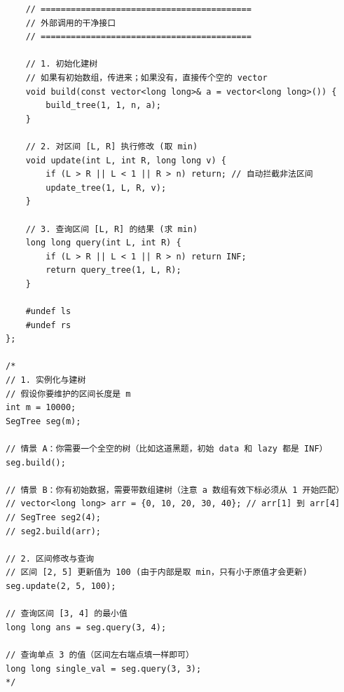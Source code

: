 \documentclass[10pt, a4paper, twocolumn]{article} %
\begin{document}
\begin{lstlisting}
    // ==========================================
    // 外部调用的干净接口
    // ==========================================

    // 1. 初始化建树 
    // 如果有初始数组，传进来；如果没有，直接传个空的 vector
    void build(const vector<long long>& a = vector<long long>()) {
        build_tree(1, 1, n, a);
    }

    // 2. 对区间 [L, R] 执行修改 (取 min)
    void update(int L, int R, long long v) {
        if (L > R || L < 1 || R > n) return; // 自动拦截非法区间
        update_tree(1, L, R, v);
    }

    // 3. 查询区间 [L, R] 的结果 (求 min)
    long long query(int L, int R) {
        if (L > R || L < 1 || R > n) return INF;
        return query_tree(1, L, R);
    }

    #undef ls
    #undef rs
};

/*
// 1. 实例化与建树
// 假设你要维护的区间长度是 m
int m = 10000;
SegTree seg(m);

// 情景 A：你需要一个全空的树（比如这道黑题，初始 data 和 lazy 都是 INF）
seg.build(); 

// 情景 B：你有初始数据，需要带数组建树（注意 a 数组有效下标必须从 1 开始匹配）
// vector<long long> arr = {0, 10, 20, 30, 40}; // arr[1] 到 arr[4]
// SegTree seg2(4);
// seg2.build(arr);

// 2. 区间修改与查询
// 区间 [2, 5] 更新值为 100 (由于内部是取 min，只有小于原值才会更新)
seg.update(2, 5, 100);

// 查询区间 [3, 4] 的最小值
long long ans = seg.query(3, 4);

// 查询单点 3 的值（区间左右端点填一样即可）
long long single_val = seg.query(3, 3);
*/
    \end{lstlisting}
\end{document}
